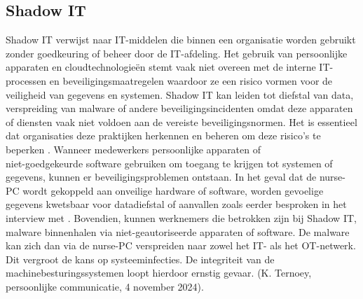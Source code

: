 \subsection{Shadow IT}
Shadow IT verwijst naar IT-middelen die binnen een organisatie worden gebruikt zonder goedkeuring of beheer door de IT-afdeling.
Het gebruik van persoonlijke apparaten en cloudtechnologieën stemt vaak niet overeen met de interne IT-processen en beveiligingsmaatregelen waardoor ze een 
risico vormen voor de veiligheid van gegevens en systemen. Shadow IT kan leiden tot diefstal van data, 
verspreiding van malware of andere beveiligingsincidenten omdat deze apparaten of diensten vaak niet voldoen aan de vereiste beveiligingsnormen. 
Het is essentieel dat organisaties deze praktijken herkennen en beheren om deze risico’s te beperken \autocite{NCSC2023}.
Wanneer medewerkers persoonlijke apparaten of \\niet-goedgekeurde software gebruiken om toegang te krijgen tot systemen of gegevens, kunnen er beveiligingsproblemen 
ontstaan. In het geval dat de nurse-PC wordt gekoppeld aan onveilige hardware of software, worden gevoelige gegevens kwetsbaar voor 
datadiefstal of aanvallen zoals eerder besproken in het interview met \textcite{Hecker2021}.
Bovendien, kunnen werknemers die betrokken zijn bij Shadow IT, malware binnenhalen via niet-geautoriseerde apparaten of software. 
De malware kan zich dan via de nurse-PC verspreiden naar zowel het IT- als het OT-netwerk. 
Dit vergroot de kans op systeeminfecties. De integriteit van de machinebesturingssystemen loopt hierdoor ernstig gevaar. (K. Ternoey, persoonlijke communicatie, 4 november 2024).



